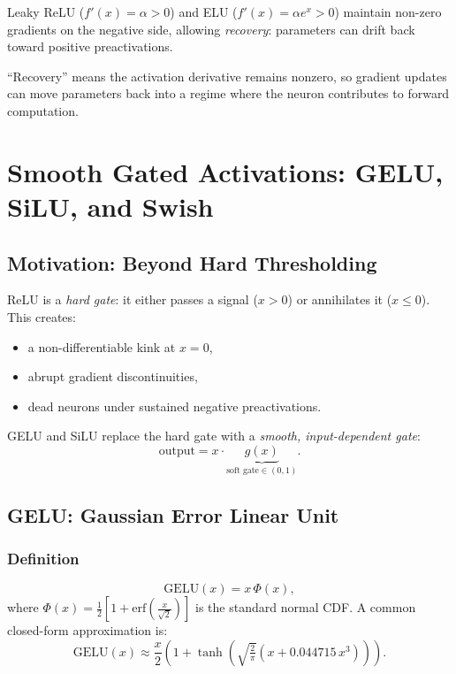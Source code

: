 \documentclass[12pt,a4paper]{article}
\theoremstyle{definition}
\theoremstyle{remark}
\begin{document}
Leaky ReLU ($f'(x)=\alpha>0$) and ELU ($f'(x)=\alpha e^x > 0$) maintain non-zero gradients on the negative side, allowing \emph{recovery}: parameters can drift back toward positive preactivations.

\begin{keybox}
``Recovery'' means the activation derivative remains nonzero, so gradient updates can move parameters back into a regime where the neuron contributes to forward computation.
\end{keybox}

\section{Smooth Gated Activations: GELU, SiLU, and Swish}
\label{sec:gelu}

\subsection{Motivation: Beyond Hard Thresholding}

ReLU is a \emph{hard gate}: it either passes a signal ($x > 0$) or annihilates it ($x \le 0$). This creates:
\begin{itemize}
    \item a non-differentiable kink at $x=0$,
    \item abrupt gradient discontinuities,
    \item dead neurons under sustained negative preactivations.
\end{itemize}
GELU and SiLU replace the hard gate with a \emph{smooth, input-dependent gate}:
\[
\text{output} = x \cdot \underbrace{g(x)}_{\text{soft gate}\in(0,1)}.
\]

\subsection{GELU: Gaussian Error Linear Unit}

\subsubsection{Definition}

\[
\mathrm{GELU}(x) = x\,\Phi(x),
\]
where $\Phi(x) = \frac{1}{2}\!\left[1 + \mathrm{erf}\!\left(\tfrac{x}{\sqrt{2}}\right)\right]$ is the standard normal CDF. A common closed-form approximation is:
\[
\mathrm{GELU}(x) \approx \frac{x}{2}\!\left(1 + \tanh\!\left(\sqrt{\tfrac{2}{\pi}}\left(x + 0.044715\,x^3\right)\right)\right).
\]
\end{document}
